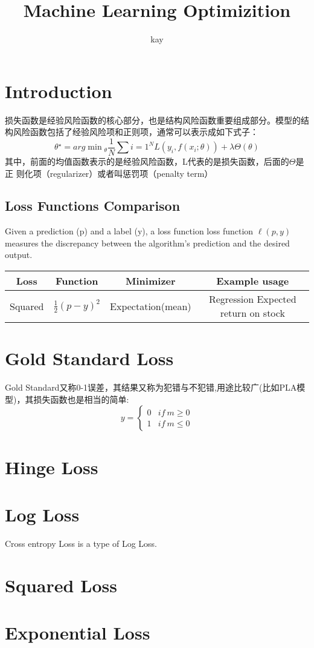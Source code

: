 \documentclass[hyperref, UTF-8]{ctexart}
\author{kay}
\title{Machine Learning Optimizition}
\begin{document}
\maketitle
\tableofcontents

\section{Introduction}

损失函数是经验风险函数的核心部分，也是结构风险函数重要组成部分。模型的结构风险函数包括了经验风险项和正则项，通常可以表示成如下式子：
\begin{displaymath}
  \theta{^\star} = arg \min{_\theta} \frac{1}{N}\sum{i=1}^N \mathit{L} (y_i,
  f(x_i; \theta)) + \lambda \Theta(\theta)
\end{displaymath}
其中，前面的均值函数表示的是经验风险函数，L代表的是损失函数，后面的$\Theta$是正
则化项（regularizer）或者叫惩罚项（penalty term）

\subsection{Loss Functions Comparison}
Given a prediction (p) and a label (y), a loss function loss function
$\ell(p,y)$ measures the discrepancy between the algorithm's prediction and the
desired output.   \\
\begin{tabular}{|c|c|c|c|}
  \hline
  Loss & Function & Minimizer & Example usage \\ \hline
  Squared & $\frac{1}{2}(p-y)^2$ & Expectation(mean) & Regression Expected return on stock \\  \hline
\end{tabular}

\section{Gold Standard Loss}
Gold Standard又称0-1误差，其结果又称为犯错与不犯错,用途比较广(比如PLA模型)，其损失函数也是相当的简单:
\begin{displaymath}
  y = \left \{
      \begin{array}{ll}
        0 & if ~ m \geqslant 0  \\
        1 &  if ~ m \leqslant 0 
      \end{array}  \right.
\end{displaymath}

\section{Hinge Loss}

\section{Log Loss}
Cross entropy Loss is a type of Log Loss.

\section{Squared Loss}

\section{Exponential Loss}
\end{document}
